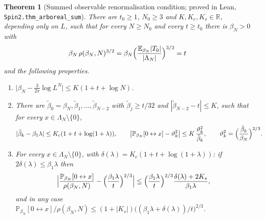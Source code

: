\documentclass[11pt]{amsart}
\newtheorem{theorem}{Theorem}[section]
\theoremstyle{definition}
\theoremstyle{remark}
\numberwithin{equation}{section}
\newcommand{\R}{\mathbb{R}}
\newcommand{\E}{\mathbb{E}}
\newcommand{\conn}{\leftrightarrow}
\begin{document}
\begin{theorem}[Summed observable renormalisation condition; proved in Lean, \texttt{Spin2.thm\_arboreal\_sum}]\label{thm:obs-sum}
There are $t_0\ge1$, $N_0\ge3$ and $K,K_c,K_s\in\R$, depending only on $L$, such that for every $N\ge N_0$ and every
$t\ge t_0$ there is $\beta_N>0$ with
\begin{equation}\label{e:obs-sum-cond}
  \beta_N\,\rho(\beta_N,N)^{3/2}=\beta_N\Bigl(\frac{\E_{\beta_N}|T_0|}{|\Lambda_N|}\Bigr)^{3/2}=t
\end{equation}
and the following properties.
\begin{enumerate}[label=(\roman*)]
\item $\bigl|\beta_N-\frac3{2\pi}\log L^N\bigr|\le K(1+t+\log N)$.
\item There are $\tilde\beta_0=\beta_N,\tilde\beta_1,\dots,\tilde\beta_{N-2}$ with $\tilde\beta_j\ge t/32$ and
$|\tilde\beta_{N-2}-t|\le K$, such that for every $x\in\Lambda_N\setminus\{0\}$,
\begin{equation}
  |\tilde\beta_k-\beta_1\lambda|\le K_c(1+t+\log(1+\lambda)),\qquad
  \bigl|\mathbb{P}_{\beta_N}[0\conn x]-\vartheta_k^2\bigr|\le K\,\frac{\vartheta_k^2}{\tilde\beta_k},\qquad
  \vartheta_k^2=\Bigl(\frac{\tilde\beta_k}{\beta_N}\Bigr)^{2/3}.
\end{equation}
\item For every $x\in\Lambda_N\setminus\{0\}$, with $\delta(\lambda)=K_c(1+t+\log(1+\lambda))$: if
$2\delta(\lambda)\le\beta_1\lambda$ then
\begin{equation}
  \Bigl|\frac{\mathbb{P}_{\beta_N}[0\conn x]}{\rho(\beta_N,N)}-\Bigl(\frac{\beta_1\lambda}{t}\Bigr)^{2/3}\Bigr|
  \le\Bigl(\frac{\beta_1\lambda}{t}\Bigr)^{2/3}\frac{\delta(\lambda)+2K_s}{\beta_1\lambda},
\end{equation}
and in any case
$\mathbb{P}_{\beta_N}[0\conn x]/\rho(\beta_N,N)\le(1+|K_s|)\bigl((\beta_1\lambda+\delta(\lambda))/t\bigr)^{2/3}$.
\end{enumerate}
\end{theorem}
\end{document}
